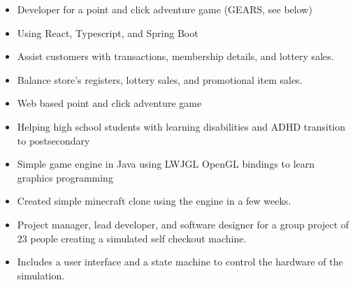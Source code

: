     \begin{paracol}{2}

        \begin{itemize}
            \item Developer for a point and click adventure game (GEARS, see below)
            \item Using React, Typescript, and Spring Boot
        \end{itemize}

        \divider

        \begin{itemize}
            \item Assist customers with transactions, membership details, and lottery sales.
            \item Balance store's registers, lottery sales, and promotional item sales.
        \end{itemize}


        \begin{itemize}
            \item Web based point and click adventure game
            \item Helping high school students with learning disabilities and ADHD transition to postsecondary
        \end{itemize}

        \divider

        \begin{itemize}
            \item Simple game engine in Java using LWJGL OpenGL bindings to learn graphics programming
            \item Created simple minecraft clone using the engine in a few weeks.
        \end{itemize}

        \divider

        \begin{itemize}
            \item Project manager, lead developer, and software designer for a group project of 23 people creating a simulated self checkout machine.
            \item Includes a user interface and a state machine to control the hardware of the simulation.
        \end{itemize}


\end{paracol}
